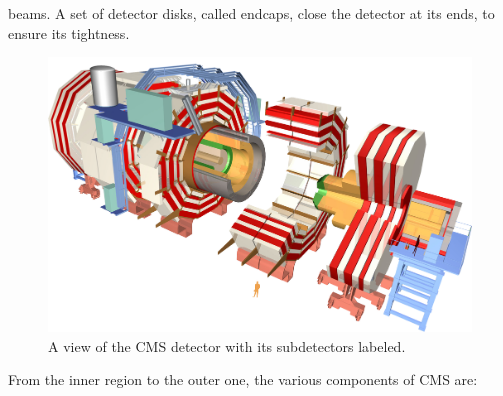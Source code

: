 beams. A set of detector disks, called endcaps, close the detector at its ends, to ensure its
tightness. 
\begin{figure}
\centering
\includegraphics[scale= 1]{../Cap2/cms}
\caption{A view of the CMS detector with its subdetectors labeled.}
\label{cms}
\end{figure}
From the inner region to the outer one, the various components of CMS are:
